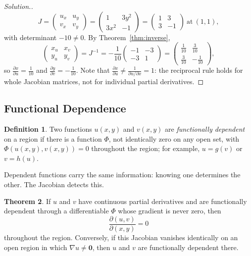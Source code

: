\documentclass[11pt,a4paper]{article}
\theoremstyle{definition}
\newtheorem{thm}{Theorem}[subsection]
\newtheorem{defn}[thm]{Definition}
\newenvironment{solution}
  {\renewcommand{\qedsymbol}{}\begin{proof}[\textit{Solution}.]}
  {\end{proof}}
\begin{document}
\begin{solution}
\[J = \begin{pmatrix} u_x & u_y\\ v_x & v_y\end{pmatrix} = \begin{pmatrix} 1 &
3y^2\\ 3x^2 & -1\end{pmatrix} = \begin{pmatrix} 1 & 3\\ 3 &
-1\end{pmatrix}\ \text{at}\ (1,1),\]
with determinant $-10\neq 0$. By Theorem~\ref{thm:inverse},
\[\begin{pmatrix} x_u & x_v\\ y_u & y_v\end{pmatrix} = J^{-1} = -\frac{1}{10}
\begin{pmatrix} -1 & -3\\ -3 & 1\end{pmatrix} = \begin{pmatrix} \frac{1}{10} &
\frac{3}{10}\\ \frac{3}{10} & -\frac{1}{10}\end{pmatrix},\]
so $\frac{\partial x}{\partial u} = \frac{1}{10}$ and
$\frac{\partial y}{\partial v} = -\frac{1}{10}$. Note that
$\frac{\partial x}{\partial u}\neq\frac{1}{\partial u/\partial x} = 1$: the
reciprocal rule holds for whole Jacobian matrices, not for individual partial
derivatives.
\end{solution}

{\color[wave]{485}\subsection{Functional Dependence}}

\begin{defn}
\label{defn:dependent}
Two functions $u(x,y)$ and $v(x,y)$ are \emph{functionally dependent} on a region
if there is a function $\Phi$, not identically zero on any open set, with
$\Phi(u(x,y),v(x,y)) = 0$ throughout the region; for example, $u = g(v)$ or
$v = h(u)$.
\end{defn}

Dependent functions carry the same information: knowing one determines the
other. The Jacobian detects this.

\begin{thm}
\label{thm:dependence}
If $u$ and $v$ have continuous partial derivatives and are functionally dependent
through a differentiable $\Phi$ whose gradient is never zero, then
\[\frac{\partial (u,v)}{\partial (x,y)} = 0\]
throughout the region. Conversely, if this Jacobian vanishes identically on an
open region in which $\nabla u\neq\mathbf 0$, then $u$ and $v$ are functionally
dependent there.
\end{thm}
\end{document}
